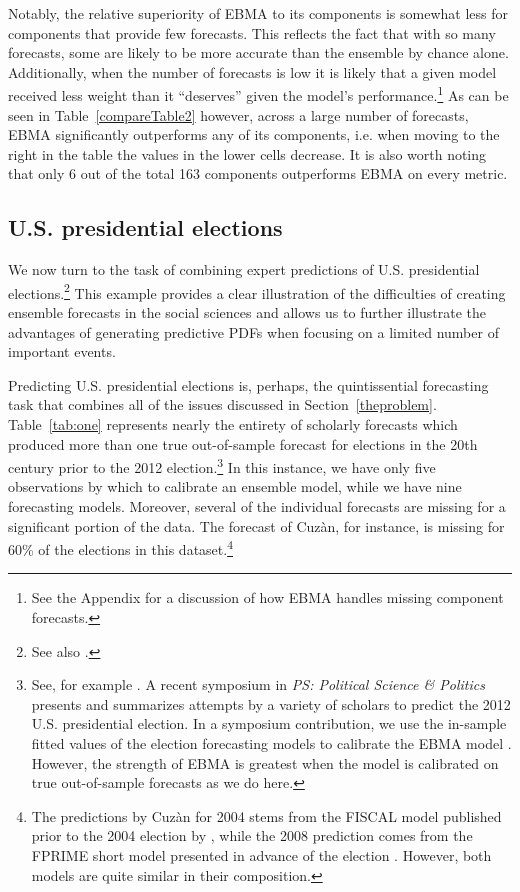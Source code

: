 \documentclass[12pt,fullpage,endnotes]{article}
\begin{document}
Notably, the relative superiority of EBMA to its components is
somewhat less for components that provide few forecasts.  This
reflects the fact that with so many forecasts, some are likely to be
more accurate than the ensemble by chance alone. Additionally, when
the number of forecasts is low it is likely that a given model
received less weight than it ``deserves'' given the model's
performance.\footnote{See the Appendix for a discussion of how EBMA
  handles missing component forecasts.}  As can be seen in Table~\ref{compareTable2} however, across a large
  number of forecasts, EBMA significantly outperforms any of its
  components, i.e. when moving to the right in the table the values in the lower cells decrease. It is also worth noting
  that only 6 out of the total 163 components outperforms EBMA on
  every metric.




\subsection{U.S. presidential elections}

We now turn to the task of combining expert predictions of
U.S. presidential elections.\footnote{See also
  \citep{Montgomery:2012c}.}  This example provides a clear
illustration of the difficulties of creating ensemble forecasts in the
social sciences and allows us to further illustrate the advantages of
generating predictive PDFs when focusing on a limited number of
important events.

Predicting U.S. presidential elections is, perhaps, the quintissential
forecasting task that combines all of the issues discussed in
Section~\ref{theproblem}.  Table~\ref{tab:one} represents nearly the
entirety of scholarly forecasts which produced more than one true
out-of-sample forecast for elections in the 20th century prior to the
2012 election.\footnote{ See, for example \citet[][]{Fair:2009,
    Fair2011, Abramowitz:2008, Campbell:2008,
    Cuzan:2004,Cuzan:Bundrick:2008,hibbs:2012, Lockerbie:2008,
    Erikson:Wlezien:2008, Graefe:2010, Holbrook:2008}.  A recent
  symposium in {\em PS: Political Science \& Politics} presents and
  summarizes attempts by a variety of scholars to predict the 2012
  U.S. presidential election. In a symposium contribution, we use the
  in-sample fitted values of the election forecasting models to
  calibrate the EBMA model \citep{Montgomery:2012c}. However, the
  strength of EBMA is greatest when the model is calibrated on true
  out-of-sample forecasts as we do here.}  In this instance, we have
only five observations by which to calibrate an ensemble model, while
we have nine forecasting models.  Moreover, several of the individual
forecasts are missing for a significant portion of the data.  The
forecast of Cuz\`an, for instance, is missing for 60\% of the
elections in this dataset.\footnote{The predictions by Cuz\`an for
  2004 stems from the FISCAL model published prior to the 2004
  election by \citet{Cuzan:2004}, while the 2008 prediction comes from
  the FPRIME short model presented in advance of the election
  \citep{Cuzan:Bundrick:2008}. However, both models are quite similar
  in their composition.}
\end{document}
